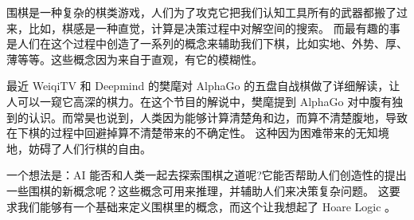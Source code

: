 

围棋是一种复杂的棋类游戏，人们为了攻克它把我们认知工具所有的武器都搬了过来，比如，棋感是一种直觉，计算是决策过程中对解空间的搜索。
而最有趣的事是人们在这个过程中创造了一系列的概念来辅助我们下棋，比如实地、外势、厚、薄等等。这些概念因为来自于直观，有它的模糊性。

最近 WeiqiTV 和 Deepmind 的樊麾对 AlphaGo 的五盘自战棋做了详细解读，让人可以一窥它高深的棋力。在这个节目的解说中，樊麾提到 AlphaGo
对中腹有独到的认识。而常昊也说到，人类因为能够计算清楚角和边，而算不清楚腹地，导致在下棋的过程中回避掉算不清楚带来的不确定性。
这种因为困难带来的无知境地，妨碍了人们行棋的自由。

一个想法是：AI 能否和人类一起去探索围棋之道呢?它能否帮助人们创造性的提出一些围棋的新概念呢？这些概念可用来推理，并辅助人们来决策复杂问题。
这要求我们能够有一个基础来定义围棋里的概念，而这个让我想起了 Hoare Logic 。








